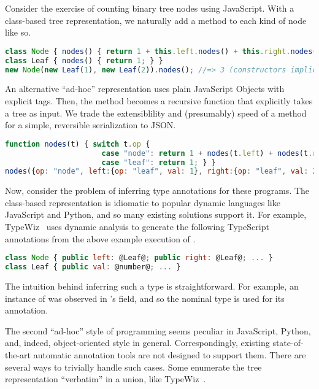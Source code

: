 \label{infer:chapter:intro}

%

Consider the exercise of counting binary tree nodes using JavaScript.
With a class-based tree representation, we naturally add a method
to each kind of node like so.

\begin{lstlisting}[language=JavaScript]
class Node { nodes() { return 1 + this.left.nodes() + this.right.nodes(); } }
class Leaf { nodes() { return 1; } }
new Node(new Leaf(1), new Leaf(2)).nodes(); //=> 3 (constructors implicit)
\end{lstlisting}

An alternative ``ad-hoc'' representation uses plain JavaScript Objects
with explicit tags.
Then, the method becomes a recursive function that explicitly takes a tree as input.
We trade the extensiblility and (presumably) speed of a method for a simple, reversible serialization to JSON.

\begin{lstlisting}[language=JavaScript]
function nodes(t) { switch t.op { 
                      case "node": return 1 + nodes(t.left) + nodes(t.right);
                      case "leaf": return 1; } }
nodes({op: "node", left:{op: "leaf", val: 1}, right:{op: "leaf", val: 2}})//=>3
\end{lstlisting}

Now, consider the problem of inferring type annotations for these programs.
The class-based representation is idiomatic to popular dynamic languages
like JavaScript and Python, and so many existing solutions support it.
For example, TypeWiz~ uses dynamic analysis to generate
the following TypeScript annotations from the above example execution of .

\begin{lstlisting}[language=JavaScript]
class Node { public left: @Leaf@; public right: @Leaf@; ... }
class Leaf { public val: @number@; ... }
\end{lstlisting}

The intuition behind inferring such a type is straightforward.
For example, an instance of  was observed in 's  field,
and so the nominal type  is used for its annotation.

The second ``ad-hoc'' style of programming seems peculiar in JavaScript, Python, and, indeed,
object-oriented style in general.
Correspondingly, existing state-of-the-art automatic annotation tools are not designed
to support them.
There are several ways to trivially handle such cases.
Some enumerate the tree representation ``verbatim'' in a union, like TypeWiz~.

